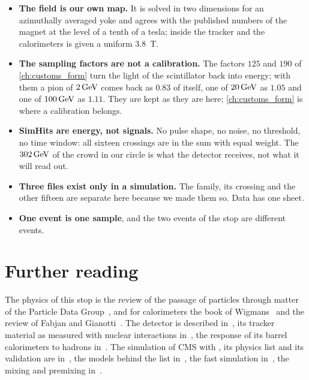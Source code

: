 \begin{itemize}
  \item \textbf{The field is our own map.} It is solved in two dimensions
    for an azimuthally averaged yoke and agrees with the published numbers
    of the magnet at the level of a tenth of a tesla; inside the tracker and
    the calorimeters \GEANT is given a uniform $3.8$~T.
  \item \textbf{The sampling factors are not a calibration.} The factors
    $125$ and $190$ of \cref{ch:customs_form} turn the light of the
    scintillator back into energy; with them a pion of $2\,\mathrm{GeV}$ comes back
    as $0.83$ of itself, one of $20\,\mathrm{GeV}$ as
    $1.05$ and one of $100\,\mathrm{GeV}$ as
    $1.11$. They are kept as they are here;
    \cref{ch:customs_form} is where a calibration belongs.
  \item \textbf{SimHits are energy, not signals.} No pulse shape, no noise,
    no threshold, no time window: all sixteen crossings are in the sum with
    equal weight. The $302\,\mathrm{GeV}$
    of the crowd in our circle is what the detector receives, not what it
    will read out.
  \item \textbf{Three files exist only in a simulation.} The family, its
    crossing and the other fifteen are separate here because we made them
    so. Data has one sheet.
  \item \textbf{One event is one sample}, and the two events of the stop are
    different events.
\end{itemize}

\section{Further reading}
\label{sec:crowd_at_the_border:further_reading}
The physics of this stop is the review of the passage of particles through
matter of the Particle Data Group~\cite{ParticleDataGroup:2024cfk}, and for
calorimeters the book of Wigmans~\cite{Wigmans:2000vf} and the review of
Fabjan and Gianotti~\cite{Fabjan:2003aq}. The detector is described
in~\cite{CMS:2008xjf,CMS:2024aqx}, its tracker material as measured with
nuclear interactions in~\cite{CMS:2018wqs}, the response of its barrel
calorimeters to hadrons in~\cite{USCMS:2009fxn}. The simulation of CMS with
\GEANT, its physics list and its validation are
in~\cite{CMS:2021dly,Srimanobhas:2024nmy,Banerjee:2017bhj}, the models
behind the list in~\cite{Wright:2015xia}, the fast simulation
in~\cite{Abdullin:2011zz,Rahmat:2011xp}, the mixing and premixing
in~\cite{Hildreth:2017caz}.

